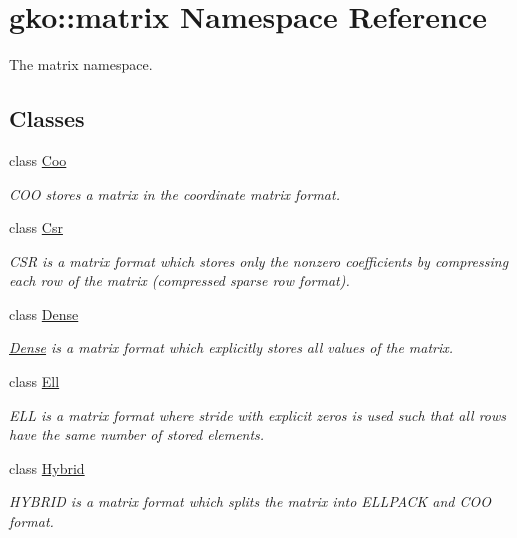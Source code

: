 \hypertarget{namespacegko_1_1matrix}{}\section{gko\+:\+:matrix Namespace Reference}
\label{namespacegko_1_1matrix}


The matrix namespace.  


\subsection*{Classes}
\begin{DoxyCompactItemize}
\item 
class \hyperlink{classgko_1_1matrix_1_1Coo}{Coo}
\begin{DoxyCompactList}\small\item\em C\+OO stores a matrix in the coordinate matrix format. \end{DoxyCompactList}\item 
class \hyperlink{classgko_1_1matrix_1_1Csr}{Csr}
\begin{DoxyCompactList}\small\item\em C\+SR is a matrix format which stores only the nonzero coefficients by compressing each row of the matrix (compressed sparse row format). \end{DoxyCompactList}\item 
class \hyperlink{classgko_1_1matrix_1_1Dense}{Dense}
\begin{DoxyCompactList}\small\item\em \hyperlink{classgko_1_1matrix_1_1Dense}{Dense} is a matrix format which explicitly stores all values of the matrix. \end{DoxyCompactList}\item 
class \hyperlink{classgko_1_1matrix_1_1Ell}{Ell}
\begin{DoxyCompactList}\small\item\em E\+LL is a matrix format where stride with explicit zeros is used such that all rows have the same number of stored elements. \end{DoxyCompactList}\item 
class \hyperlink{classgko_1_1matrix_1_1Hybrid}{Hybrid}
\begin{DoxyCompactList}\small\item\em H\+Y\+B\+R\+ID is a matrix format which splits the matrix into E\+L\+L\+P\+A\+CK and C\+OO format. \end{DoxyCompactList}\item 

\end{DoxyCompactItemize}
